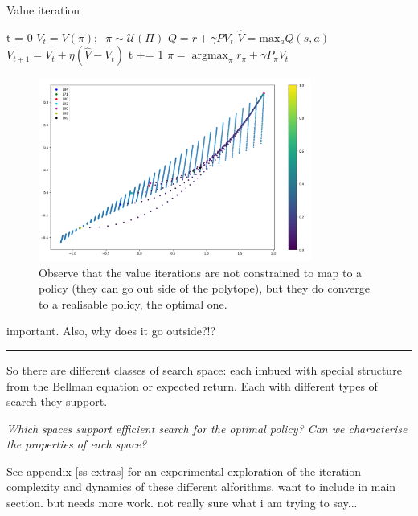 \begin{algorithm}
\caption{Value iteration}
\begin{algorithmic}[1]

  \State t = 0
  \State $V_t = V(\pi) ; \;\; \pi \sim \mathcal U(\Pi)$ 
    \State $Q = r + \gamma PV_t$ 
    \State $\hat V = \text{max}_a Q(s, a)$
    \State $V_{t+1} = V_t + \eta (\hat V - V_t)$ 
    \State t += 1
  \EndWhile
  \State $\pi = \mathop{\text{argmax}}_{\pi} r_{\pi} + \gamma P_{\pi}V_t$
  \State \algorithmicreturn{ $\pi$}
\EndProcedure

\end{algorithmic}
\end{algorithm}

\begin{figure}[h!]
\centering
\includegraphics[width=0.8\textwidth,height=0.4\textheight]{../../pictures/figures/vi-polytope.png}
\caption{Observe that the value iterations are not constrained to map to a policy
(they can go out side of the polytope), but they do converge to a realisable policy,
the optimal one.}
\end{figure}

{\color{red}important. Also, why does it go outside?!?}

\newpage

\begin{center}\rule{0.5\linewidth}{\linethickness}\end{center}

So there are different classes of search space: each imbued with special
structure from the Bellman equation or expected return. Each with different types of search they
support.

\begin{displayquote}
\textit{Which spaces support efficient search for the optimal policy? Can we characterise the properties of each space?}
\end{displayquote}

See appendix \ref{ss-extras} for an experimental exploration of the iteration complexity and dynamics of these different alforithms.
{\color{red}want to include in main section. but needs more work. not really sure what i am trying to say...}
